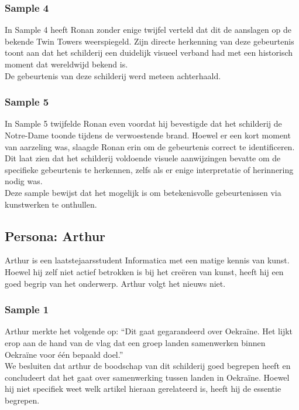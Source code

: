 \subsubsection{Sample 4}
In Sample 4 heeft Ronan zonder enige twijfel verteld dat dit de aanslagen op de bekende Twin Towers weerspiegeld. Zijn directe herkenning van deze gebeurtenis toont aan dat het schilderij een duidelijk visueel verband had met een historisch moment dat wereldwijd bekend is. \\

De gebeurtenis van deze schilderij werd meteen achterhaald.

\subsubsection{Sample 5}
In Sample 5 twijfelde Ronan even voordat hij bevestigde dat het schilderij de Notre-Dame toonde tijdens de verwoestende brand. Hoewel er een kort moment van aarzeling was, slaagde Ronan erin om de gebeurtenis correct te identificeren. Dit laat zien dat het schilderij voldoende visuele aanwijzingen bevatte om de specifieke gebeurtenis te herkennen, zelfs als er enige interpretatie of herinnering nodig was. \\

Deze sample bewijst dat het mogelijk is om betekenisvolle gebeurtenissen via kunstwerken te onthullen. 


\subsection{Persona: Arthur}
Arthur is een laatstejaarsstudent Informatica met een matige kennis van kunst. Hoewel hij zelf niet actief betrokken is bij het creëren van kunst, heeft hij een goed begrip van het onderwerp. Arthur volgt het nieuws niet. 

\subsubsection{Sample 1}
Arthur merkte het volgende op: ``Dit gaat gegarandeerd over Oekraïne. Het lijkt erop aan de hand van de vlag dat een groep landen samenwerken binnen Oekraïne voor één bepaald doel.'' \\

We besluiten dat arthur de boodschap van dit schilderij goed begrepen heeft en concludeert dat het gaat over samenwerking tussen landen in Oekraïne. Hoewel hij niet specifiek weet welk artikel hieraan gerelateerd is, heeft hij de essentie begrepen. 

